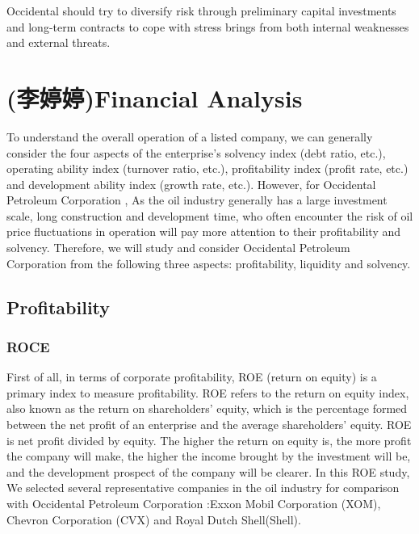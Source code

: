 \documentclass[
	a4paper, %
	12pt,%
]{CSSullivanBusinessReport}
\begin{document}
\begin{fullwidth}
Occidental should try to diversify risk through preliminary capital investments and long-term contracts to cope with stress brings from both internal weaknesses and external threats.

\section{(李婷婷)Financial Analysis}
To understand the overall operation of a listed company, we can generally consider the four aspects of the enterprise's solvency index (debt ratio, etc.), operating ability index (turnover ratio, etc.), profitability index (profit rate, etc.) and development ability index (growth rate, etc.). However, for Occidental Petroleum Corporation , As the oil industry generally has a large investment scale, long construction and development time, who often encounter the risk of oil price fluctuations in operation will pay more attention to their profitability and solvency. Therefore, we will study and consider  Occidental Petroleum Corporation from the following three aspects: profitability, liquidity and solvency.

\subsection{Profitability}

\subsubsection{ROCE}
First of all, in terms of corporate profitability, ROE (return on equity) is a primary index to measure profitability. ROE refers to the return on equity index, also known as the return on shareholders' equity, which is the percentage formed between the net profit of an enterprise and the average shareholders' equity. ROE is net profit divided by equity. The higher the return on equity is, the more profit the company will make, the higher the income brought by the investment will be, and the development prospect of the company will be clearer. In this ROE study, We selected several representative companies in the oil industry for comparison with Occidental Petroleum Corporation :Exxon Mobil Corporation (XOM), Chevron Corporation (CVX) and Royal Dutch Shell(Shell).


\end{fullwidth}
\end{document}
